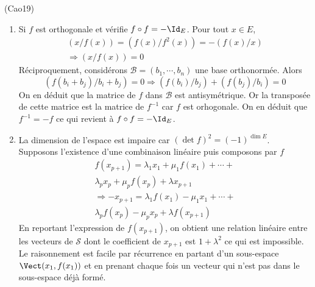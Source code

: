\begin{tiny}(Cao19)\end{tiny}
\begin{enumerate}
 \item Si $f$ est orthogonale et vérifie $f\circ f =-\Id_E$. Pour tout $x\in E$,
\begin{multline*}
 (x/f(x))=(f(x)/f^2(x))=-(f(x)/x) \\ \Rightarrow (x/f(x))=0
\end{multline*}
Réciproquement, considérons $\mathcal{B}=(b_1,\cdots,b_n)$ une base orthonormée. Alors
\begin{displaymath}
 (f(b_i+b_j)/b_i+b_j)=0\Rightarrow (f(b_i)/b_j)+(f(b_j)/b_i)=0
\end{displaymath}
On en déduit que la matrice de $f$ dans $\mathcal{B}$ est antisymétrique. Or la transposée de cette matrice est la matrice de $f^{-1}$ car $f$ est orhogonale. On en déduit que $f^{-1}=-f$ ce qui revient à $f\circ f =-\Id_E$.
\item La dimension de l'espace est impaire car $(\det f)^2=(-1)^{\dim E}$. Supposons l'existence d'une combinaison linéaire puis composons par $f$
\begin{multline*}
 f(x_{p+1})=\lambda_1x_1+\mu_1f(x_1)+\cdots +\\ \lambda_px_p+\mu_pf(x_p)+\lambda x_{p+1}\\
\Rightarrow
-x_{p+1}= \lambda_1f(x_1)-\mu_1 x_1+\cdots + \\\lambda_pf(x_p)-\mu_p x_p +\lambda f(x_{p+1})
\end{multline*}
En reportant l'expression de $f(x_{p+1})$, on obtient une relation linéaire entre les vecteurs de $\mathcal{S}$ dont le coefficient de $x_{p+1}$ est $1+\lambda^2$ ce qui est impossible.\newline
Le raisonnement est facile par récurrence en partant d'un sous-espace $\Vect(x_1,f(x_1))$ et en prenant chaque fois un vecteur qui n'est pas dans le sous-espace déjà formé.
\end{enumerate}
 